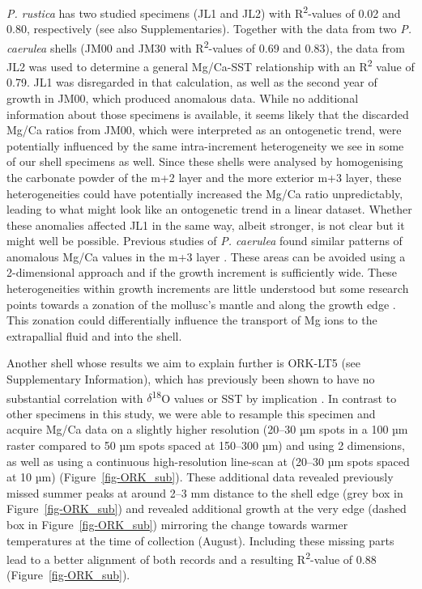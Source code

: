 \documentclass[
  authoryear,
  preprint,
  3p]{elsarticle}
\begin{document}
\normalsize

\emph{P. rustica} has two studied specimens (JL1 and JL2) with
R\textsuperscript{2}-values of 0.02 and 0.80, respectively
\citep{Ferguson2011-zl} (see also Supplementaries). Together with the
data from two \emph{P. caerulea} shells (JM00 and JM30 with
R\textsuperscript{2}-values of 0.69 and 0.83), the data from JL2 was
used to determine a general Mg/Ca-SST relationship with an
R\textsuperscript{2} value of 0.79. JL1 was disregarded in that
calculation, as well as the second year of growth in JM00, which
produced anomalous data. While no additional information about those
specimens is available, it seems likely that the discarded Mg/Ca ratios
from JM00, which were interpreted as an ontogenetic trend, were
potentially influenced by the same intra-increment heterogeneity we see
in some of our shell specimens as well. Since these shells were analysed
by homogenising the carbonate powder of the m+2 layer and the more
exterior m+3 layer, these heterogeneities could have potentially
increased the Mg/Ca ratio unpredictably, leading to what might look like
an ontogenetic trend in a linear dataset. Whether these anomalies
affected JL1 in the same way, albeit stronger, is not clear but it might
well be possible. Previous studies of \emph{P. caerulea} found similar
patterns of anomalous Mg/Ca values in the m+3 layer
\citep{Hausmann2019-fi}. These areas can be avoided using a
2-dimensional approach and if the growth increment is sufficiently wide.
These heterogeneities within growth increments are little understood but
some research points towards a zonation of the mollusc's mantle and
along the growth edge \citep{Lazareth2013-jf}. This zonation could
differentially influence the transport of Mg ions to the extrapallial
fluid and into the shell.

Another shell whose results we aim to explain further is ORK-LT5 (see
Supplementary Information), which has previously been shown to have no
substantial correlation with \(\delta\)\textsuperscript{18}O values or
SST by implication \citep{Graniero2017-io}. In contrast to other
specimens in this study, we were able to resample this specimen and
acquire Mg/Ca data on a slightly higher resolution (20--30 µm spots in a
100 µm raster compared to 50 µm spots spaced at 150--300 µm) and using 2
dimensions, as well as using a continuous high-resolution line-scan at
(20--30 µm spots spaced at 10 µm) (Figure~\ref{fig-ORK_sub}). These
additional data revealed previously missed summer peaks at around 2--3
mm distance to the shell edge (grey box in Figure~\ref{fig-ORK_sub}) and
revealed additional growth at the very edge (dashed box in
Figure~\ref{fig-ORK_sub}) mirroring the change towards warmer
temperatures at the time of collection (August). Including these missing
parts lead to a better alignment of both records and a resulting
R\textsuperscript{2}-value of 0.88 (Figure~\ref{fig-ORK_sub}).
\end{document}
